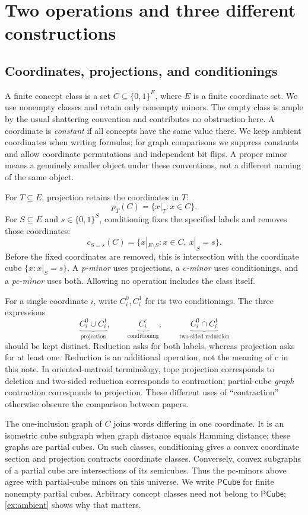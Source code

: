 \documentclass[11pt]{article}
\theoremstyle{definition}
\newcommand{\bits}{\{0,1\}}
\newcommand{\PCube}{\mathsf{PCube}}
\begin{document}
\section{Two operations and three different constructions}

\subsection{Coordinates, projections, and conditionings}

A finite concept class is a set $C\subseteq\bits^E$, where $E$ is a finite
coordinate set. We use nonempty classes and retain only nonempty minors.
The empty class is ample by the usual shattering convention and contributes
no obstruction here. A coordinate is \emph{constant} if all concepts have
the same value there. We keep ambient coordinates when writing formulas;
for graph comparisons we suppress constants and allow coordinate permutations
and independent bit flips. A proper minor means a genuinely smaller object
under these conventions, not a different naming of the same object.

For $T\subseteq E$, projection retains the coordinates in $T$:
\[
 p_T(C)=\{x|_T:x\in C\}.
\]
For $S\subseteq E$ and $s\in\bits^S$, conditioning fixes the specified labels
and removes those coordinates:
\[
 c_{S=s}(C)=\{x|_{E\setminus S}:x\in C,\ x|_S=s\}.
\]
Before the fixed coordinates are removed, this is intersection with the
coordinate cube $\{x:x|_S=s\}$. A \emph{p-minor} uses projections, a
\emph{c-minor} uses conditionings, and a \emph{pc-minor} uses both.
Allowing no operation includes the class itself.

For a single coordinate $i$, write $C_i^0,C_i^1$ for its two conditionings.
The three expressions
\[
 \underbrace{C_i^0\cup C_i^1}_{\text{projection}},\qquad
 \underbrace{C_i^\varepsilon}_{\text{conditioning}},\qquad
 \underbrace{C_i^0\cap C_i^1}_{\text{two-sided reduction}}
\]
should be kept distinct. Reduction asks for both labels, whereas projection
asks for at least one. Reduction is an additional operation, not the meaning
of c in this note. In oriented-matroid terminology, tope projection corresponds
to deletion and two-sided reduction corresponds to contraction; partial-cube
\emph{graph} contraction corresponds to projection. These different uses of
``contraction'' otherwise obscure the comparison between papers.

The one-inclusion graph of $C$ joins words differing in one coordinate.
It is an isometric cube subgraph when graph distance equals Hamming distance;
these graphs are partial cubes. On such classes, conditioning gives a convex
coordinate section and projection contracts coordinate classes. Conversely,
convex subgraphs of a partial cube are intersections of its semicubes.
Thus the pc-minors above agree with partial-cube minors on this universe.
We write $\PCube$ for finite nonempty partial cubes. Arbitrary concept classes
need not belong to $\PCube$; \cref{ex:ambient} shows why that matters.
\end{document}
